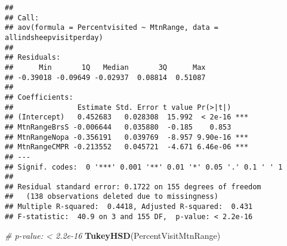 \documentclass[]{article}
\newenvironment{Shaded}{\begin{snugshade}}{\end{snugshade}}
\newcommand{\CommentTok}[1]{\textcolor[rgb]{0.56,0.35,0.01}{\textit{#1}}}
\newcommand{\DataTypeTok}[1]{\textcolor[rgb]{0.13,0.29,0.53}{#1}}
\newcommand{\KeywordTok}[1]{\textcolor[rgb]{0.13,0.29,0.53}{\textbf{#1}}}
\newcommand{\NormalTok}[1]{#1}
\newcommand{\OperatorTok}[1]{\textcolor[rgb]{0.81,0.36,0.00}{\textbf{#1}}}
\newcommand{\StringTok}[1]{\textcolor[rgb]{0.31,0.60,0.02}{#1}}
\begin{document}
\begin{Shaded}
\end{Shaded}

\begin{verbatim}
## 
## Call:
## aov(formula = Percentvisited ~ MtnRange, data = allindsheepvisitperday)
## 
## Residuals:
##      Min       1Q   Median       3Q      Max 
## -0.39018 -0.09649 -0.02937  0.08814  0.51087 
## 
## Coefficients:
##               Estimate Std. Error t value Pr(>|t|)    
## (Intercept)   0.452683   0.028308  15.992  < 2e-16 ***
## MtnRangeBrsS -0.006644   0.035880  -0.185    0.853    
## MtnRangeNopa -0.356191   0.039769  -8.957 9.90e-16 ***
## MtnRangeCMPR -0.213552   0.045721  -4.671 6.46e-06 ***
## ---
## Signif. codes:  0 '***' 0.001 '**' 0.01 '*' 0.05 '.' 0.1 ' ' 1
## 
## Residual standard error: 0.1722 on 155 degrees of freedom
##   (138 observations deleted due to missingness)
## Multiple R-squared:  0.4418, Adjusted R-squared:  0.431 
## F-statistic:  40.9 on 3 and 155 DF,  p-value: < 2.2e-16
\end{verbatim}

\begin{Shaded}
\begin{Highlighting}[]
\CommentTok{#  p-value: < 2.2e-16}
\KeywordTok{TukeyHSD}\NormalTok{(PercentVisitMtnRange)}
\end{Highlighting}
\end{Shaded}
\end{document}
